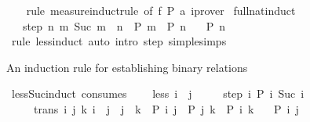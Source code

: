 \begin{isabellebody}
%
\isadelimproof
\ \ %
\endisadelimproof
%
\isatagproof
{}\isamarkupfalse%
\ {\isacharparenleft}{\kern0pt}rule\ measure{\isacharunderscore}{\kern0pt}induct{\isacharunderscore}{\kern0pt}rule\ {\isacharbrackleft}{\kern0pt}of\ f\ P\ a{\isacharbrackright}{\kern0pt}{\isacharparenright}{\kern0pt}\ iprover%
\endisatagproof
{\isafoldproof}%
%
\isadelimproof
\isanewline
%
\endisadelimproof
\isanewline
{}\isamarkupfalse%
\ full{\isacharunderscore}{\kern0pt}nat{\isacharunderscore}{\kern0pt}induct{\isacharcolon}{\kern0pt}\isanewline
\ \ \ step{\isacharcolon}{\kern0pt}\ {\isachardoublequoteopen}{\isasymAnd}n{\isachardot}{\kern0pt}\ {\isacharparenleft}{\kern0pt}{\isasymforall}m{\isachardot}{\kern0pt}\ Suc\ m\ {\isasymle}\ n\ {\isasymlongrightarrow}\ P\ m{\isacharparenright}{\kern0pt}\ {\isasymLongrightarrow}\ P\ n{\isachardoublequoteclose}\isanewline
\ \ \ {\isachardoublequoteopen}P\ n{\isachardoublequoteclose}\isanewline
%
\isadelimproof
\ \ %
\endisadelimproof
%
\isatagproof
{}\isamarkupfalse%
\ {\isacharparenleft}{\kern0pt}rule\ less{\isacharunderscore}{\kern0pt}induct{\isacharparenright}{\kern0pt}\ {\isacharparenleft}{\kern0pt}auto\ intro{\isacharcolon}{\kern0pt}\ step\ simp{\isacharcolon}{\kern0pt}le{\isacharunderscore}{\kern0pt}simps{\isacharparenright}{\kern0pt}%
\endisatagproof
{\isafoldproof}%
%
\isadelimproof
%
\endisadelimproof
%
\begin{isamarkuptext}%
An induction rule for establishing binary relations%
\end{isamarkuptext}\isamarkuptrue%
\isamarkupfalse%
\ less{\isacharunderscore}{\kern0pt}Suc{\isacharunderscore}{\kern0pt}induct\ {\isacharbrackleft}{\kern0pt}consumes\ {}{\isacharbrackright}{\kern0pt}{\isacharcolon}{\kern0pt}\isanewline
\ \ \ less{\isacharcolon}{\kern0pt}\ {\isachardoublequoteopen}i\ {\isacharless}{\kern0pt}\ j{\isachardoublequoteclose}\isanewline
\ \ \ \ \ step{\isacharcolon}{\kern0pt}\ {\isachardoublequoteopen}{\isasymAnd}i{\isachardot}{\kern0pt}\ P\ i\ {\isacharparenleft}{\kern0pt}Suc\ i{\isacharparenright}{\kern0pt}{\isachardoublequoteclose}\isanewline
\ \ \ \ \ trans{\isacharcolon}{\kern0pt}\ {\isachardoublequoteopen}{\isasymAnd}i\ j\ k{\isachardot}{\kern0pt}\ i\ {\isacharless}{\kern0pt}\ j\ {\isasymLongrightarrow}\ j\ {\isacharless}{\kern0pt}\ k\ {\isasymLongrightarrow}\ P\ i\ j\ {\isasymLongrightarrow}\ P\ j\ k\ {\isasymLongrightarrow}\ P\ i\ k{\isachardoublequoteclose}\isanewline
\ \ \ {\isachardoublequoteopen}P\ i\ j{\isachardoublequoteclose}\isanewline

\end{isabellebody}
